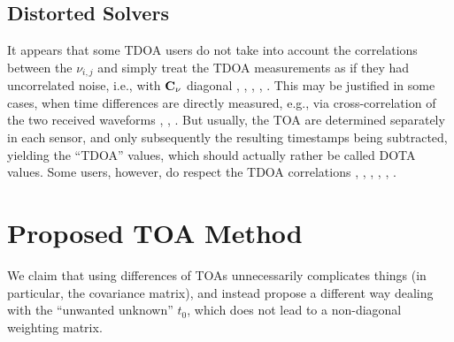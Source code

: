 \documentclass[conference]{IEEEtran}
\begin{document}
\subsection{Distorted Solvers}
\label{sec:TDOA:distorted}
It appears that some \ac{TDOA} users do not take into account the correlations between the $\nu_{i,j}$ and simply treat the \ac{TDOA} measurements as if they had uncorrelated noise, i.e., with ${\mathbf C}_\nu$ diagonal 
\cite[Eq.~29]{Beck2008_ExactAndApproximateSolutionsOfSourceLocalizationProblems}, 
\cite[Eq.~10-11]{Kaune2012_WideAreaMultilaterationUsingADSBTransponderSignals}, 
\cite[Eq.~7]{Figuet2020_CombinedMultilaterationWithMachineLearningForEnhancedAircraftLocalization}, 
\cite[Eq.~10]{Markochev2021_AircraftLocalizationUsingATCDataWithNanosecondPrecisionFromDistributedCrowdsourcedReceivers}, 
\cite[Eq.~5-6]{Rydell2025_LocalizationUsingDVBTSignalsExperimentalInsightsAndValidation}. 
%
%
This may be justified in some cases, when time differences are directly measured, e.g., via cross-correlation of the two received waveforms
\cite{Szabo2025_MultilaterationOfDemodulatedRadioSignals}, 
\cite{Vankayalapati2014_TDOABasedDirectPositioningMaximumLikelihoodEstimatorAndTheCramerRaoBound},
\cite{ElGemayel2013_ALowCostTDOALocalizationSystemSetupChallengesAndResults}. 
But usually, the \ac{TOA} are determined separately in each sensor, and only subsequently the resulting timestamps being subtracted, yielding the ``\ac{TDOA}'' values, which should actually rather be called \ac{DOTA} values. 
%
%
Some users, however, do respect the \ac{TDOA} correlations 
\cite[Eq.~44]{Chan1994_ASimpleAndEfficientEstimatorForHyperbolicLocation}, 
\cite[Eq.~33]{Chan2006_ExactAndApproximateMaximumLikelihoodLocalizationAlgorithms},
\cite[p.~514]{Mensing2006_PositioningAlgorithmsForCellularNetworksUsingTDOA}, 
\cite[Eq.~46]{Huang2001_RealTimePassiveSourceLocalizationAPracticalLinearCorrectionLeastSquaresApproach}, 
\cite[Eq.~3]{Galati2008_MultilaterationlocalAndWideAreaAsADistributedSensorSystemLowerBoundsOfAccuracy}, 
\cite[Eq.~8]{Mikus2025_AccuracyStudyOnJointSourceAndSensorLocalizationUsingDOAAndTDOAMeasurementsWithClockBiases}. 


%
%
\section{Proposed TOA Method} 
We claim that using differences of \acp{TOA} unnecessarily complicates things (in particular, the covariance matrix), and instead propose a different way dealing with the ``unwanted unknown'' $t_0$, which does not lead to a non-diagonal weighting matrix. 
\end{document}

